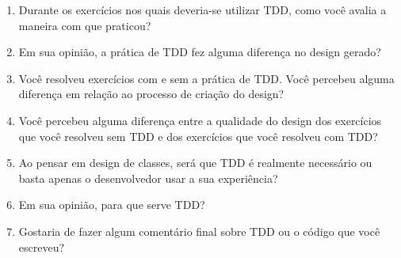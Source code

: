 \begin{enumerate}
	
\item Durante os exercícios nos quais deveria-se utilizar TDD, como você avalia a maneira com que praticou?	

\item Em sua opinião, a prática de TDD fez alguma diferença no design gerado?	

\item Você resolveu exercícios com e sem a prática de TDD. Você percebeu alguma diferença em relação ao processo de criação do design?	

\item Você percebeu alguma diferença entre a qualidade do design dos exercícios que você resolveu sem TDD e dos exercícios que você resolveu com TDD?	

\item Ao pensar em design de classes, será que TDD é realmente necessário ou basta apenas o desenvolvedor usar a sua experiência?	

\item Em sua opinião, para que serve TDD?	

\item Gostaria de fazer algum comentário final sobre TDD ou o código que você escreveu?	

\end{enumerate}
